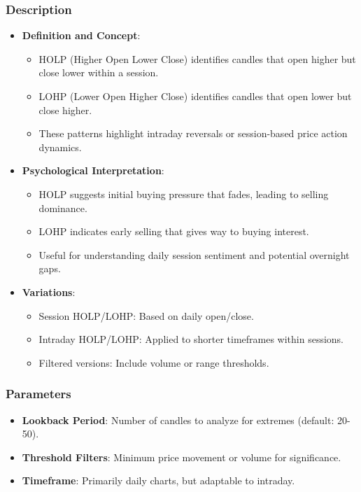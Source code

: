 \documentclass[12pt]{article}
\begin{document}
\subsubsection{Description}
\begin{itemize}
\item \textbf{Definition and Concept}:
  \begin{itemize}
  \item HOLP (Higher Open Lower Close) identifies candles that open higher but close lower within a session.
  \item LOHP (Lower Open Higher Close) identifies candles that open lower but close higher.
  \item These patterns highlight intraday reversals or session-based price action dynamics.
  \end{itemize}
\item \textbf{Psychological Interpretation}:
  \begin{itemize}
  \item HOLP suggests initial buying pressure that fades, leading to selling dominance.
  \item LOHP indicates early selling that gives way to buying interest.
  \item Useful for understanding daily session sentiment and potential overnight gaps.
  \end{itemize}
\item \textbf{Variations}:
  \begin{itemize}
  \item Session HOLP/LOHP: Based on daily open/close.
  \item Intraday HOLP/LOHP: Applied to shorter timeframes within sessions.
  \item Filtered versions: Include volume or range thresholds.
  \end{itemize}
\end{itemize}

\subsubsection{Parameters}
\begin{itemize}
\item \textbf{Lookback Period}: Number of candles to analyze for extremes (default: 20-50).
\item \textbf{Threshold Filters}: Minimum price movement or volume for significance.
\item \textbf{Timeframe}: Primarily daily charts, but adaptable to intraday.
\end{itemize}
\end{document}
